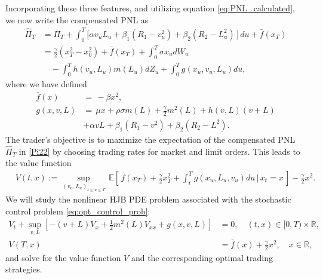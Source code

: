 \documentclass[12pt, letterpaper]{article}
\def\R{{\mathbb R}}        %
\def\E{{\mathbb E}}        %
\numberwithin{equation}{section}
\numberwithin{theorem}{section}
\begin{document}
Incorporating these three features, and utilizing equation \eqref{eq:PNL_calculated}, we now write  the compensated PNL as
\begin{align}
\widehat{\Pi}_T &=\Pi_T+\int_0^T\!\big[ \alpha v_uL_u +  \beta_1(R_1-v_u^2)+\beta_2(R_2-L_u^2) \,\big]\,du+\bar{f}(x_T)\label{PNL_comp}\\
 &=\frac{\gamma}{2}\left(x_T^2-x_0^2\right)+\bar{f}(x_T)+\int_0^T \sigma x_u dW_u\\
 &\quad  - \int_0^T h(v_u,L_u)m(L_u)dZ_u+\int_0^Tg(x_u,v_u,L_u)du,\label{Pi22}
\end{align}
where we have defined 
\begin{equation}
\begin{aligned}
\bar{f} (x) &=\, -{\beta} x^2,\\
g(x,v,L)&=\, \mu x +\rho \sigma m(L)+\frac{\gamma}{2}m^2(L)+h(v,L)(v+L)\\&+\alpha vL+\beta_1(R_1-v^2)+\beta_2(R_2-L^2).\label{fun_g}
\end{aligned}
\end{equation}
  The trader's objective is to maximize the expectation of the compensated PNL $\widehat{\Pi}_T$ in  \eqref{Pi22} by choosing trading rates for market and limit orders.  This   leads to  the value function
\begin{equation}\label{eq:opt_control_prob}
\begin{aligned}
&V(t,x):=\underset{(v_u,L_u)_{t\le u\le T}}{\sup}\,\E\left[\,\bar{f}(x_T)+\frac{\gamma}{2}x_T^2+\int_t^T g(x_u,L_u,v_u) du\,\Big|\,x_t=x\,\right]-\frac{\gamma}{2}x^2.
\end{aligned}
\end{equation}
We will study the nonlinear HJB PDE problem associated with the stochastic control problem  \eqref{eq:opt_control_prob}:
\begin{equation}\label{HJBeq_TaiHo}
	\begin{aligned}
 V_t+\underset{v,L}{\sup}\left[-(v+L)V_x+\frac{1}{2}m^2(L)V_{xx}+g(x,v,L)\right] &= 0, \quad (t,x) \in [0,T) \times \R,\\
 V(T,x)&=\bar{f}(x)+\frac{\gamma}{2}x^2, \quad x \in \R,
\end{aligned}
\end{equation} and solve for the value function $V$ and the corresponding optimal trading strategies. 



\end{document}
